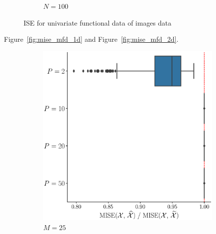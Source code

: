 \begin{results}
\begin{figure}
\begin{subfigure}[b]{0.49\textwidth}
         \caption{$N = 100$}
         \label{fig:ise_mfd_2d_100}
    \end{subfigure}
    \caption{ISE for univariate functional data of images data}
    \label{fig:ise_mfd_2d}
\end{figure}

\end{results}

\begin{results}

Figure~\ref{fig:mise_mfd_1d} and Figure~\ref{fig:mise_mfd_2d}.

\begin{figure}
     \centering
     \begin{subfigure}[b]{0.49\textwidth}
         \centering
         \includegraphics[width=\textwidth]{figures/scenario_1/mise_N50_M25.eps}
         \caption{$M = 25$}
         \label{fig:mise_mfd_1d_25}
     \end{subfigure}
     \hfill
     \begin{subfigure}[b]{0.49\textwidth}
         \centering

\end{subfigure}
\end{figure}
\end{results}
